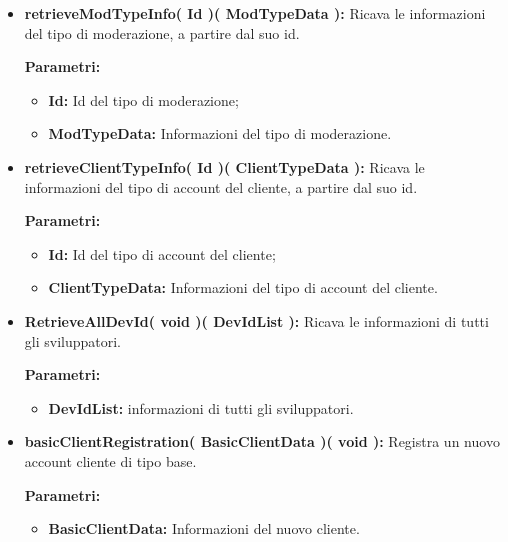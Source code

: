 \begin{itemize}
\begin{itemize}
			\item \textbf{retrieveModTypeInfo( Id )( ModTypeData ):} Ricava le informazioni del tipo di moderazione, a partire dal suo id.
				\begin{description}
    				\item[\textbf{Parametri:}]
				\end{description}
				\begin{itemize}
					\item \textbf{Id:} Id del tipo di moderazione;
					\item \textbf{ModTypeData:} Informazioni del tipo di moderazione.
				\end{itemize}
				
			\item \textbf{retrieveClientTypeInfo( Id )( ClientTypeData ):} Ricava le informazioni del tipo di account del cliente, a partire dal suo id.
				\begin{description}
    				\item[\textbf{Parametri:}]
				\end{description}
				\begin{itemize}
					\item \textbf{Id:} Id del tipo di account del cliente;
					\item \textbf{ClientTypeData:} Informazioni del tipo di account del cliente.
				\end{itemize}
			
			\item \textbf{RetrieveAllDevId( void )( DevIdList ):} Ricava le informazioni di tutti gli sviluppatori.
			\begin{description}
				\item[\textbf{Parametri:}]
			\end{description}
			\begin{itemize}
				\item \textbf{DevIdList:} informazioni di tutti gli sviluppatori.
			\end{itemize}
								
			\item \textbf{basicClientRegistration( BasicClientData )( void ):} Registra un nuovo account cliente di tipo base.
				\begin{description}
    				\item[\textbf{Parametri:}]
				\end{description}
				\begin{itemize}
					\item \textbf{BasicClientData:} Informazioni del nuovo cliente.
				\end{itemize}
				

\end{itemize}
\end{itemize}
